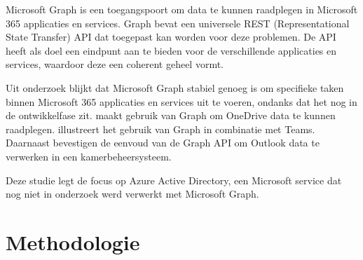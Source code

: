 Microsoft Graph is een toegangspoort om data te kunnen raadplegen in Microsoft 365 applicaties en services. Graph bevat een universele REST (Representational State Transfer) API dat toegepast kan worden voor deze problemen. De API heeft als doel een eindpunt aan te bieden voor de verschillende applicaties en services, waardoor deze een coherent geheel vormt. 

Uit onderzoek blijkt dat Microsoft Graph stabiel genoeg is om specifieke taken binnen Microsoft 365 applicaties en services uit te voeren, ondanks dat het nog in de ontwikkelfase zit. \textcite{Hoefling2022} maakt gebruik van Graph om OneDrive data te kunnen raadplegen. \textcite{Jenkins2021} illustreert het gebruik van Graph in combinatie met Teams. Daarnaast bevestigen \textcite{Parsa2019} de eenvoud van de Graph API om Outlook data te verwerken in een kamerbeheersysteem. 

Deze studie legt de focus op Azure Active Directory, een Microsoft service dat nog niet in onderzoek werd verwerkt met Microsoft Graph. 

\section{Methodologie}%
\label{sec:methodologie}

